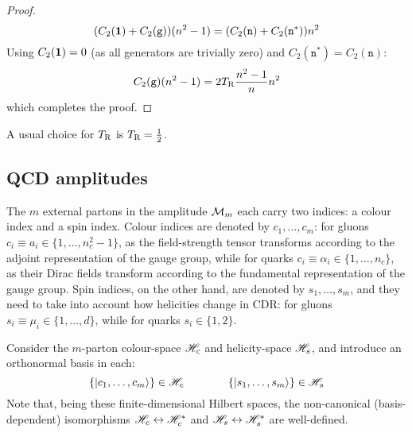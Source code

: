 \begin{proofbox}
\begin{proof}
    \begin{equation*}
      (C_2(\mathbf{1}) + C_2(\mathtt{g})) (n^2 - 1) = (C_2(\mathtt{n}) + C_2(\mathtt{n}^*)) n^2
    \end{equation*}
    Using $ C_2(\mathbf{1}) = 0 $ (as all generators are trivially zero) and $ C_2(\mathtt{n}^*) = C_2(\mathtt{n}) $:
    \begin{equation*}
      C_2(\mathtt{g}) (n^2 - 1) = 2T_\text{R} \frac{n^2 - 1}{n} n^2
    \end{equation*}
    which completes the proof.
  \end{proof}
\end{proofbox}

A usual choice for $ T_\text{R} $ is $ T_\text{R} = \frac{1}{2} $.

\subsection{QCD amplitudes}

The $ m $ external partons in the amplitude $ \mathcal{M}_m $ each carry two indices: a colour index and a spin index. Colour indices are denoted by $ c_1, \dots, c_m $: for gluons $ c_i \equiv a_i \in \{1, \dots, n_c^2 - 1\} $, as the field-strength tensor  transforms according to the adjoint representation of the gauge group, while for quarks $ c_i \equiv \alpha_i \in \{1, \dots, n_c\} $, as their Dirac fields transform according to the fundamental representation of the gauge group. Spin indices, on the other hand, are denoted by $ s_1, \dots, s_m $, and they need to take into account how helicities change in CDR: for gluons $ s_i \equiv \mu_i \in \{1, \dots, d\} $, while for quarks $ s_i \in \{1,2\} $.

Consider the $ m $-parton colour-space $ \mathscr{H}_c $ and helicity-space $ \mathscr{H}_s $, and introduce an orthonormal basis in each:
\begin{equation*}
  \{\ket{c_1, \dots, c_m}\} \in \mathscr{H}_c
  \qquad \qquad
  \{\ket{s_1, \dots, s_m}\} \in \mathscr{H}_s
\end{equation*}
Note that, being these finite-dimensional Hilbert spaces, the non-canonical (basis-dependent) isomorphisms $ \mathscr{H}_c \leftrightarrow \mathscr{H}_c^* $ and $ \mathscr{H}_s \leftrightarrow \mathscr{H}_s^* $ are well-defined\footnotemark.

